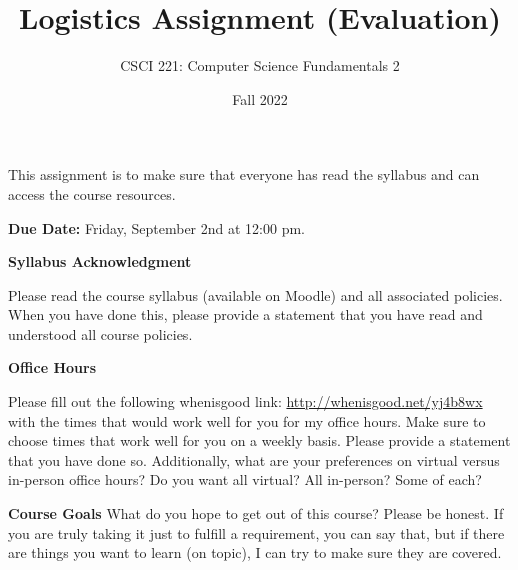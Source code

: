 \documentclass{exam}
\begin{document}
\title{Logistics Assignment (Evaluation)}
\author{CSCI 221: Computer Science Fundamentals 2}
\date{Fall 2022}
\maketitle


This assignment is to make sure that everyone has read the syllabus and can access the course resources. 

\textbf{Due Date:}
Friday, September 2nd at 12:00 pm. 

\begin{questions}

\question[5]
\textbf{Syllabus Acknowledgment}

Please read the course syllabus (available on Moodle) and all associated policies. 
When you have done this, please provide a statement that you have read and understood all course policies. 

\question[5]
\textbf{Office Hours}

Please fill out the following whenisgood link: \url{http://whenisgood.net/yj4b8wx} with the times that would work well for you for my office hours. 
Make sure to choose times that work well for you on a weekly basis. 
Please provide a statement that you have done so. 
Additionally, what are your preferences on virtual versus in-person office hours? 
Do you want all virtual? All in-person? Some of each?

\question[5]
\textbf{Course Goals}
What do you hope to get out of this course? 
Please be honest. 
If you are truly taking it just to fulfill a requirement, you can say that, but if there are things you want to learn (on topic), I can try to make sure they are covered. 
\end{questions}
\end{document}
